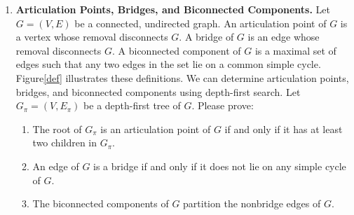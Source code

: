 \documentclass[12pt,a4paper]{article}
\theoremstyle{definition}
\begin{document}
\begin{enumerate}
\begin{proof}
\begin{enumerate}
\begin{itemize}
        According to the definition of $Dist$, we can derive that
        \begin{equation}
        Dist(v) \leq Dist(u) + 1
        \label{eq3}
        \end{equation}
        because there is a path from source to $u$ using $Dist(u)$ edges and there is an edge from $u$ to $v$. It's easy to find that Equation \eqref{eq3} contradicts our premise. Therefore, for directed graph, each cross edge $(u,v)$ yields $Dist(v)\leq Dist(u)+1$.
    \item \textbf{\color{purple} Unirected graph case: } \textbf{(Contradiction)} Suppose there is one cross edge $(u, v)$ satisfying $|Dist(v) - Dist(u)| > 1$ in the undirected graph.
        \begin{itemize}
        \item On one hand, if $Dist(v) - Dist(u) > 1$, we can use exactly the same method in the proof of directed graph to come to a contradiction.
        \item On the other hand, if $Dist(v) - Dist(u) < -1$, we can rewrite the inequality to $Dist(u) - Dist(v) > 1$, and we can use exactly the same method in the proof of directed graph, except changing the position of $u$ and $v$, to come to a contradiction.
        \end{itemize}
        Hence, both situation have contradictions. Therefore, for undirected graph, each cross edge $(u,v)$ yields $|Dist(v)-Dist(u)|\le 1$.
    \end{itemize}
    \end{enumerate}
    \end{proof}
    \clearpage


    \item
    \textbf{Articulation Points, Bridges, and Biconnected Components.} Let $G=(V, E)$ be a connected, undirected graph. An articulation point of $G$ is a vertex whose removal disconnects $G$. A bridge of $G$ is an edge whose removal disconnects $G$. A biconnected component of $G$ is a maximal set of edges such that any two edges in the set lie on a common simple cycle. Figure\ref{def} illustrates these definitions. We can determine articulation points, bridges, and biconnected components using depth-first search. Let $G_{\pi}=\left(V, E_{\pi}\right)$ be a depth-first tree of $G$. Please prove:

    \begin{enumerate}
    	\item The root of $G_{\pi}$ is an articulation point of $G$ if and only if it has at least two children in $G_{\pi}$.
    	\item An edge of $G$ is a bridge if and only if it does not lie on any simple cycle of $G$.
    	\item The biconnected components of $G$ partition the nonbridge edges of $G$.
    \end{enumerate}


\end{enumerate}
\end{document}
